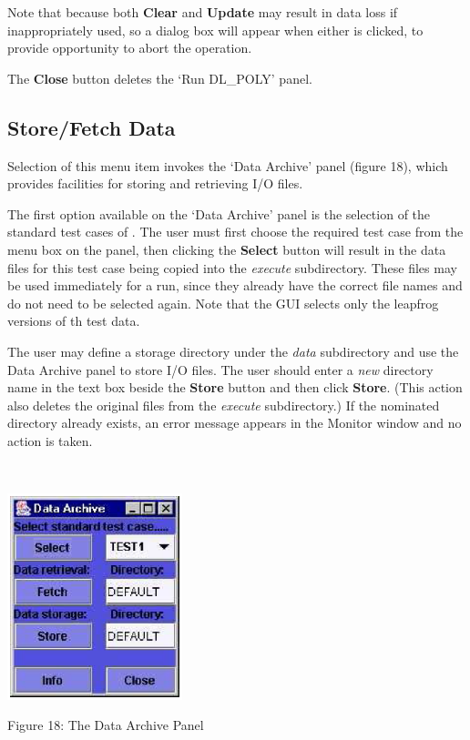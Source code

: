 Note that because both {\bf Clear} and {\bf Update} may result in data
loss if inappropriately used, so a dialog box will appear when either
is clicked, to provide opportunity to abort the operation.

The {\bf Close} button deletes the `Run DL\_POLY' panel.

\subsection{Store/Fetch Data}

Selection of this menu item invokes the `Data Archive' panel (figure
18), which provides facilities for storing and retrieving \DD{} I/O
files.

The first option available on the `Data Archive' panel is the
selection of the standard test cases of \DD{}. The user must first choose
the required test case from the menu box on the panel, then clicking
the {\bf Select} button will result in the data files for this test
case being copied into the {\em execute} subdirectory. These files may
be used immediately for a \DD{} run, since they already have the correct
file names and do not need to be selected again. Note that the GUI selects
only the leapfrog versions of th test data.

The user may define a storage directory under the \DD{} {\em data}
subdirectory and use the Data Archive panel to store \DD{} I/O files.
The user should enter a {\em new} directory name in the text box
beside the {\bf Store} button and then click {\bf Store}.  (This
action also deletes the original files from the {\em execute}
subdirectory.) If the nominated directory already exists, an error
message appears in the Monitor window and no action is taken.


~

\vskip 5mm
\centerline{\includegraphics[height=6cm]{archive.ps}}
\centerline{Figure 18: The Data Archive Panel}
\vskip 5mm

